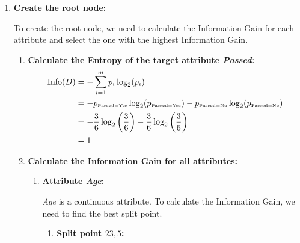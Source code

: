 \documentclass[
english,
smallborders
]{i6prcsht}
\newcommand{\OfSpecificValue}[3]{_{\text{\tiny #1#2#3}}}
\begin{document}
\begin{solution}	
	\begin{enumerate}	
		\item \textbf{Create the root node:}
		      
		      To create the root node, we need to calculate the Information Gain for each attribute and select the one with the highest Information Gain.
		      
		      \begin{enumerate}	
			      \item \textbf{Calculate the Entropy of the target attribute \textit{Passed}:}
			            \begin{alignat*}{2}
				            \text{Info}(D) & = -\sum_{i=1}^{m}p_i \log_2(p_i)                                                                                                                          \\
				                           & = -p\OfSpecificValue{Passed}{=}{Yes} \log_2(p\OfSpecificValue{Passed}{=}{Yes})- p\OfSpecificValue{Passed}{=}{No} \log_2(p\OfSpecificValue{Passed}{=}{No}) \\
				                           & = -\frac{3}{6} \log_2\left(\frac{3}{6}\right) - \frac{3}{6} \log_2\left(\frac{3}{6}\right)                                                                \\
				                           & = 1                                                                                                                                                       \\
			            \end{alignat*}
			            
			      \item \textbf{Calculate the Information Gain for all attributes:}
			            
			            \begin{enumerate}	
				            \item \textbf{Attribute \textit{Age}:}
				                  
				                  \textit{Age} is a continuous attribute. To calculate the Information Gain, we need to find the best split point.
				                  
				                  \begin{enumerate}	
					                  \item \textbf{Split point $23,5$:}
					                        

\end{enumerate}
\end{enumerate}
\end{enumerate}
\end{enumerate}
\end{solution}
\end{document}
